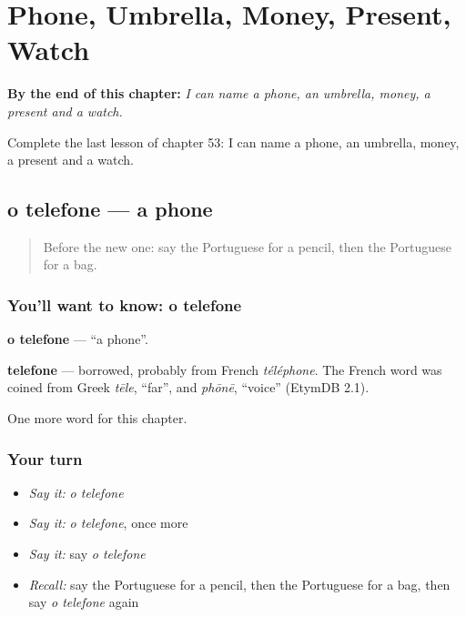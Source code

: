 
\chapter{Phone, Umbrella, Money, Present, Watch}
\label{ch:pt-phone-umbrella-money-present-watch}

\begin{chapteropening}
\textbf{By the end of this chapter:} \emph{I can name a phone, an umbrella, money, a present and a watch.}

Complete the last lesson of chapter 53: I can name a phone, an umbrella, money, a present and a watch.
\end{chapteropening}

\section[o telefone]{o telefone — a phone}

\label{lesson:PT-C53-telefone}



\begin{quote}
Before the new one: say the Portuguese for a pencil, then the Portuguese for a bag.
\end{quote}

\subsection*{You'll want to know: o telefone}
\textbf{o telefone} — \textquotedblleft{}a phone\textquotedblright{}.

\begin{cousinweb}
\textbf{telefone} — borrowed, probably from French \emph{téléphone}. The French word was coined from Greek \emph{tēle}, \textquotedblleft{}far\textquotedblright{}, and \emph{phōnē}, \textquotedblleft{}voice\textquotedblright{} (EtymDB 2.1).
\end{cousinweb}

\begin{grammarlens}[title={What you've built}]
One more word for this chapter.
\end{grammarlens}

\subsection*{Your turn}
\begin{itemize}
\raggedright
  \item \emph{Say it:} \emph{o telefone}
  \item \emph{Say it:} \emph{o telefone}, once more
  \item \emph{Say it:} say \emph{o telefone}
  \item \emph{Recall:} say the Portuguese for a pencil, then the Portuguese for a bag, then say \emph{o telefone} again
\end{itemize}

